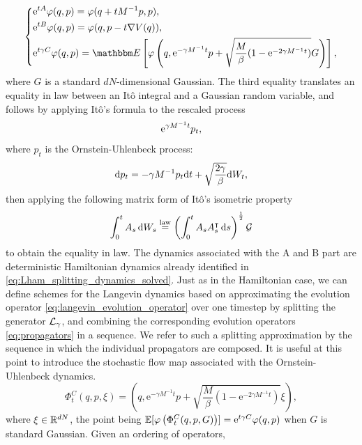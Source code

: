 \begin{equation}
  \label{eq:propagators}
  \left\{\begin{aligned}
    &\mathrm{e}^{tA}\varphi(q,p)=\varphi(q+tM^{-1}p,p),\\
    &\mathrm{e}^{tB}\varphi(q,p)=\varphi(q,p-t\nabla V(q)),\\
   &\mathrm{e}^{t\gamma C}\varphi(q,p)=\mathbbm E \left[\varphi \left(q, \mathrm e^{-\gamma M^{-1}t}p + \sqrt{\frac{M}{\beta}(1-\mathrm{e}^{-2\gamma M^{-1}t})}G\right)\right],
\end{aligned}\right.
\end{equation}
where $G$ is a standard $dN$-dimensional Gaussian. The third equality translates an equality in law between an Itô integral and a Gaussian random variable, and follows by applying Itô's formula to the rescaled process
$$\mathrm{e}^{\gamma M^{-1}t}p_t,$$
where $p_t$ is the Ornstein-Uhlenbeck process:
\begin{equation}
    \mathrm{d} p_t=-\gamma M^{-1}p_t\mathrm{d} t+\sqrt{\frac{2\gamma}{\beta}}\mathrm{d} W_t,
\end{equation}
then applying the following matrix form of Itô's isometric property 
\begin{equation}
    \label{eq:ito_isometry_matrix}
    \int_0^t A_s\,\mathrm{d} W_s \overset{\mathrm{law}}{=} \left(\int_0^t A_s A_s^\intercal \,\mathrm{d} s\right)^{\frac12}\mathcal G
\end{equation}
to obtain the equality in law.
 The dynamics associated with the A and B part are deterministic Hamiltonian dynamics already identified in \eqref{eq:Lham_splitting_dynamics_solved}.
Just as in the Hamiltonian case, we can define schemes for the Langevin dynamics based on approximating the evolution operator \eqref{eq:langevin_evolution_operator} over one timestep by splitting the generator $\mathcal{L}_\gamma$, and combining the corresponding evolution operators \eqref{eq:propagators} in a sequence.
We refer to such a splitting approximation by the sequence in which the individual propagators are composed. It is useful at this point to introduce the stochastic flow map associated with the Ornstein-Uhlenbeck dynamics.
\begin{equation}
    \label{eq:stochastic_flow_c}
    \Phi_t^C(q,p,\xi)=\left(q, \mathrm e^{-\gamma M^{-1}t}p + \sqrt{\frac{M}{\beta}(1-\mathrm{e}^{-2\gamma M^{-1}t})}\xi\right),
\end{equation}
where $\xi\in \mathbb{R}^{dN}$, the point being $\mathbb{E}[\varphi\left(\Phi_t^C(q,p,G)\right)]=\mathrm{e}^{t\gamma C}\varphi(q,p)$ when $G$ is standard Gaussian.
Given an ordering of operators, 
